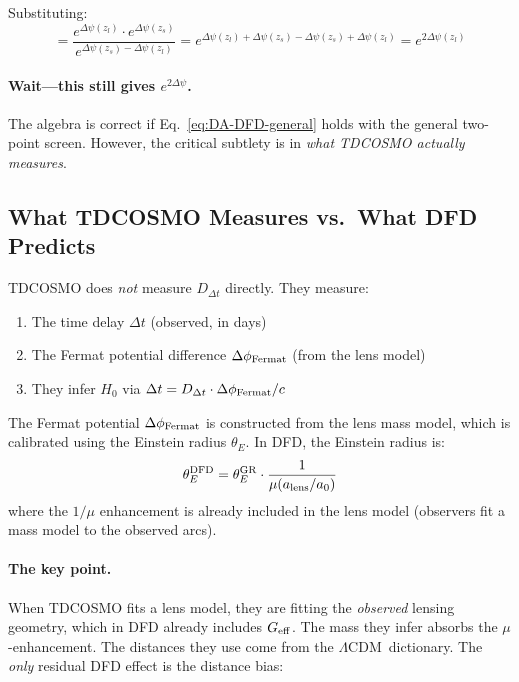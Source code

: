 \documentclass[11pt,a4paper]{article}
\newcommand{\LCDM}{$\Lambda$CDM}
\newcommand{\Geff}{G_{\rm eff}}
\newcommand{\Dpsi}{\Delta\psi}
\begin{document}
Substituting:
\begin{equation}
= \frac{e^{\Dpsi(z_l)} \cdot e^{\Dpsi(z_s)}}{e^{\Dpsi(z_s) - \Dpsi(z_l)}}
= e^{\Dpsi(z_l) + \Dpsi(z_s) - \Dpsi(z_s) + \Dpsi(z_l)}
= e^{2\Dpsi(z_l)}
\end{equation}

\paragraph{Wait---this still gives $e^{2\Dpsi}$.}
The algebra is correct if Eq.~\eqref{eq:DA-DFD-general} holds with
the general two-point screen.  However, the critical subtlety is in
\emph{what TDCOSMO actually measures}.

\subsection{What TDCOSMO Measures vs.\ What DFD Predicts}

TDCOSMO does \emph{not} measure $D_{\Delta t}$ directly.  They measure:
\begin{enumerate}
\item The time delay $\Delta t$ (observed, in days)
\item The Fermat potential difference $\Delta\phi_{\rm Fermat}$
  (from the lens model)
\item They infer $H_0$ via $\Delta t = D_{\Delta t} \cdot \Delta\phi_{\rm Fermat} / c$
\end{enumerate}

The Fermat potential $\Delta\phi_{\rm Fermat}$ is constructed from the
lens mass model, which is calibrated using the Einstein radius $\theta_E$.
In DFD, the Einstein radius is:
\begin{equation}
\theta_E^{\rm DFD} = \theta_E^{\rm GR} \cdot
\frac{1}{\mu(a_{\rm lens}/a_0)}
\end{equation}
where the $1/\mu$ enhancement is already included in the lens model
(observers fit a mass model to the observed arcs).

\paragraph{The key point.}
When TDCOSMO fits a lens model, they are fitting the \emph{observed}
lensing geometry, which in DFD already includes $\Geff$.  The mass
they infer absorbs the $\mu$-enhancement.  The distances they use
come from the \LCDM\ dictionary.  The \emph{only} residual DFD
effect is the distance bias:
\end{document}
